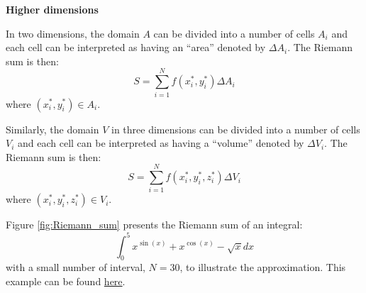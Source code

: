 \textbf{Higher dimensions}

In two dimensions, the domain $A$ can be divided into a number of cells $A_i$ and each cell can be interpreted as having an ``area'' denoted by $\Delta A_i$. The Riemann sum is then:
\begin{equation}
	S = \sum_{i=1}^N f(x_i^*, y_i^*) \Delta A_i
\end{equation}
where $(x_i^*,y_i^*) \in A_i$.

Similarly, the domain $V$ in three dimensions can be divided into a number of cells $V_i$ and each cell can be interpreted as having a ``volume'' denoted by $\Delta V_i$. The Riemann sum is then:
\begin{equation}
	S = \sum_{i=1}^N f(x_i^*, y_i^*, z_i^*) \Delta V_i
\end{equation}
where $(x_i^*,y_i^*,z_i^*) \in V_i$. 

Figure \ref{fig:Riemann_sum} presents the Riemann sum of an integral:
\begin{equation}
	\int_0^5 x^{\sin(x)} + x^{\cos(x)} - \sqrt{x} dx
\end{equation}
with a small number of interval, $N = 30$, to illustrate the approximation. This example can be found \href{https://github.com/chitn/quantfin_study/blob/master/code/integration.py}{here}.

